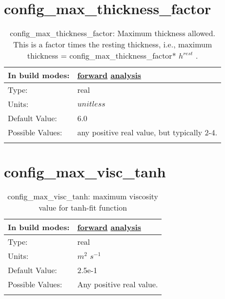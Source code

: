 \section[config\_max\_thickness\_factor]{config\_max\_thickness\_factor}
\label{sec:nm_sec_config_max_thickness_factor}
\begin{center}
\begin{longtable}{| p{2.0in} || p{4.0in} |}
    \hline
    In build modes: & \hyperref[subsec:forward_nm_tab_ALE_vertical_grid]{forward} \hyperref[subsec:analysis_nm_tab_ALE_vertical_grid]{analysis} \\
    \hline
    Type: & real \\
    \hline
    Units: & $unitless$ \\
    \hline
    Default Value: & 6.0 \\
    \hline
    Possible Values: & any positive real value, but typically 2-4. \\
    \hline
    \caption{config\_max\_thickness\_factor:  Maximum thickness allowed. This is a factor times the resting thickness, i.e., maximum thickness = config\_max\_thickness\_factor* $h^{rest}$ .}
\end{longtable}
\end{center}
\section[config\_max\_visc\_tanh]{config\_max\_visc\_tanh}
\label{sec:nm_sec_config_max_visc_tanh}
\begin{center}
\begin{longtable}{| p{2.0in} || p{4.0in} |}
    \hline
    In build modes: & \hyperref[subsec:forward_nm_tab_vmix_tanh]{forward} \hyperref[subsec:analysis_nm_tab_vmix_tanh]{analysis} \\
    \hline
    Type: & real \\
    \hline
    Units: & $m^2$ $s^{-1}$ \\
    \hline
    Default Value: & 2.5e-1 \\
    \hline
    Possible Values: & Any positive real value. \\
    \hline
    \caption{config\_max\_visc\_tanh: maximum viscosity value for tanh-fit function}
\end{longtable}
\end{center}
